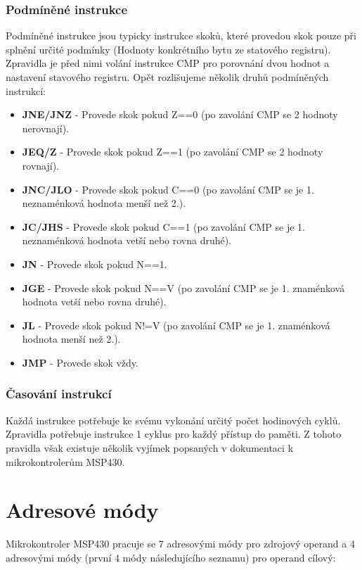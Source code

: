 \subsubsection{Podmíněné instrukce}

Podmíněné instrukce jsou typicky instrukce skoků, které provedou skok pouze při splnění určité podmínky (Hodnoty konkrétního bytu ze statového registru). Zpravidla je před nimi volání instrukce CMP pro porovnání dvou hodnot a nastavení stavového registru. Opět rozlišujeme několik druhů podmíněných instrukcí:

\begin{itemize}
\item \textbf{JNE/JNZ} - Provede skok pokud Z==0 (po zavolání CMP se 2 hodnoty nerovnají).
\item \textbf{JEQ/Z} - Provede skok pokud Z==1 (po zavolání CMP se 2 hodnoty rovnají).
\item \textbf{JNC/JLO} - Provede skok pokud C==0 (po zavolání CMP se je 1. neznaménková hodnota menší než 2.).
\item \textbf{JC/JHS} - Provede skok pokud C==1 (po zavolání CMP se je 1. neznaménková hodnota vetší nebo rovna druhé).
\item \textbf{JN} - Provede skok pokud N==1.
\item \textbf{JGE} - Provede skok pokud N==V (po zavolání CMP se je 1. znaménková hodnota vetší nebo rovna druhé).
\item \textbf{JL} - Provede skok pokud N!=V (po zavolání CMP se je 1. znaménková hodnota menší než 2.).
\item \textbf{JMP} - Provede skok vždy.
\end{itemize}

\subsubsection{Časování instrukcí}

Každá instrukce potřebuje ke svému vykonání určitý počet hodinových cyklů. Zpravidla potřebuje instrukce 1 cyklus pro každý přístup do paměti. Z tohoto pravidla však existuje několik vyjímek popsaných v dokumentaci k mikrokontrolerům MSP430.
 
\section{Adresové módy}

Mikrokontroler MSP430 pracuje se 7 adresovými módy pro zdrojový operand a 4 adresovými módy (první 4 módy následujícího seznamu) pro operand cílový:

